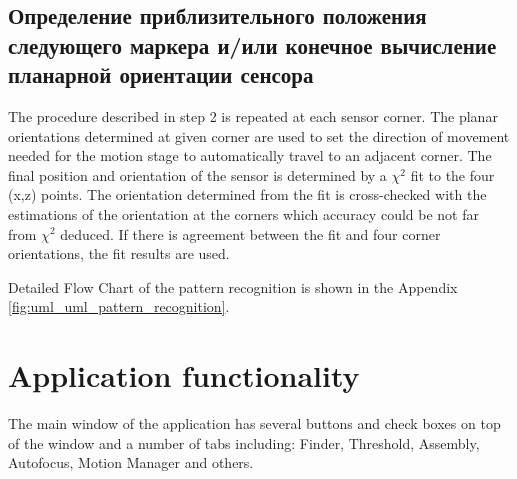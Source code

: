 \subsection{Определение приблизительного положения следующего маркера и/или конечное вычисление планарной ориентации сенсора}
The procedure described in step 2 is repeated at each sensor corner. The planar orientations determined at given corner are used to set the direction of movement needed for the motion stage to automatically travel to an adjacent corner. The final position and orientation of the sensor is determined by a $\chi^{2}$ fit to the four (x,z) points. The orientation determined from the fit is cross-checked with the estimations of the orientation at the corners which accuracy could be not far from $\chi^{2}$ deduced. If there is agreement between the fit and four corner orientations, the fit results are used.

Detailed Flow Chart of the pattern recognition is shown in the Appendix \ref{fig:uml_uml_pattern_recognition}.

\section{Application functionality}

The main window of the application has several buttons and check boxes on top of the window and a number of tabs including: Finder, Threshold, Assembly, Autofocus, Motion Manager and others.

